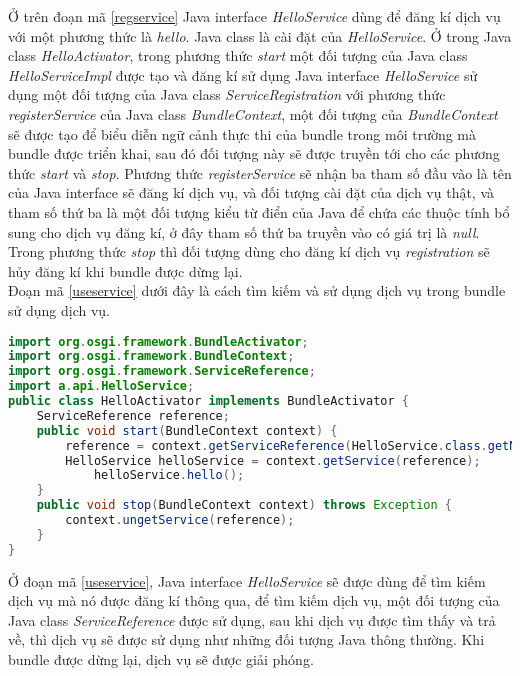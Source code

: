 Ở trên đoạn mã \ref{regservice} Java interface \textit{HelloService} dùng để đăng kí dịch vụ với một phương thức là \textit{hello}. Java class  là cài đặt của \textit{HelloService}. Ở trong Java class \textit{HelloActivator}, trong phương thức \textit{start} một đối tượng của Java class \textit{HelloServiceImpl} được tạo và đăng kí sử dụng Java interface \textit{HelloService} sử dụng một đối tượng của Java class  \textit{ServiceRegistration} với phương thức \textit{registerService} của Java class \textit{BundleContext}, một đối tượng của \textit{BundleContext} sẽ được tạo để biểu diễn ngữ cảnh thực thi của bundle trong môi trường mà bundle được triển khai, sau đó đối tượng này sẽ được truyền tới cho các phương thức \textit{start} và \textit{stop}. Phương thức \textit{registerService} sẽ nhận ba tham số đầu vào là tên của Java interface sẽ đăng kí dịch vụ, và đối tượng cài đặt của dịch vụ thật, và tham số thứ ba là một đối tượng kiểu từ điển của Java để chứa các thuộc tính bổ sung cho dịch vụ đăng kí, ở đây tham số thứ ba truyền vào có giá trị là \textit{null}.
Trong phương thức \textit{stop} thì đối tượng dùng cho đăng kí dịch vụ \textit{registration} sẽ hủy đăng kí khi bundle được dừng lại. \\

Đoạn mã \ref{useservice} dưới đây là cách tìm kiếm và sử dụng dịch vụ trong bundle sử dụng dịch vụ.

\begin{lstlisting}[label=useservice, 
inputencoding=utf8,
breaklines=true,
language=Java,
basicstyle=\ttfamily\footnotesize,
caption=Sử dụng một dịch vụ dùng mã Java]
import org.osgi.framework.BundleActivator;
import org.osgi.framework.BundleContext;
import org.osgi.framework.ServiceReference;
import a.api.HelloService;
public class HelloActivator implements BundleActivator {
    ServiceReference reference;
    public void start(BundleContext context) {
        reference = context.getServiceReference(HelloService.class.getName()) ;
        HelloService helloService = context.getService(reference);
		    helloService.hello();
    }
    public void stop(BundleContext context) throws Exception {
        context.ungetService(reference);
    }
}
\end{lstlisting}
Ở đoạn mã \ref{useservice}, Java interface \textit{HelloService} sẽ được dùng để tìm kiếm dịch vụ mà nó được đăng kí thông qua, để tìm kiếm dịch vụ, một đối tượng của Java class \textit{ServiceReference} được sử dụng, sau khi dịch vụ được tìm thấy và trả về, thì dịch vụ sẽ được sử dụng như những đối tượng Java thông thường. Khi bundle được dừng lại, dịch vụ sẽ được giải phóng.\\

